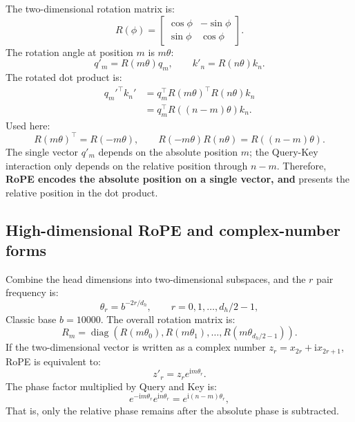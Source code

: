 \documentclass[UTF8,fontset=none,a4paper,10pt]{ctexart}
\newcommand{\term}[1]{\textbf{#1}}
\begin{document}
The two-dimensional rotation matrix is:
\begin{equation}
  R(\phi)=
  \begin{bmatrix}
    \cos\phi&-\sin\phi\\
    \sin\phi&\cos\phi
  \end{bmatrix}.
  \label{en:eq:rotation}
\end{equation}
The rotation angle at position $m$ is $m\theta$:
\begin{equation}
  q'_m=R(m\theta)q_m,\qquad k'_n=R(n\theta)k_n.
  \label{en:eq:rope-rotate}
\end{equation}
The rotated dot product is:
\begin{equation}
  \begin{aligned}
  q_m'^\top k_n'
  &=q_m^\top R(m\theta)^\top R(n\theta)k_n\\
  &=q_m^\top R((n-m)\theta)k_n.
  \end{aligned}
  \label{en:eq:rope-core}
\end{equation}
Used here:
\begin{equation}
  R(m\theta)^\top=R(-m\theta),\qquad
  R(-m\theta)R(n\theta)=R((n-m)\theta).
  \label{en:eq:rotation-group}
\end{equation}
The single vector $q'_m$ depends on the absolute position $m$; the Query-Key interaction only depends on the relative position through $n-m$. Therefore, \term{RoPE encodes the absolute position on a single vector, and } presents the relative position in the dot product.

\subsection{High-dimensional RoPE and complex-number forms}

Combine the head dimensions into two-dimensional subspaces, and the $r$ pair frequency is:
\begin{equation}
  \theta_r=b^{-2r/d_h},\qquad r=0,1,\ldots,d_h/2-1,
  \label{en:eq:rope-frequency}
\end{equation}
Classic base $b=10000$. The overall rotation matrix is:
\begin{equation}
  R_m=\operatorname{diag}\left(
  R(m\theta_0),R(m\theta_1),\ldots,R(m\theta_{d_h/2-1})
  \right).
  \label{en:eq:rope-block}
\end{equation}
If the two-dimensional vector is written as a complex number $z_r=x_{2r}+\mathrm{i}x_{2r+1}$, RoPE is equivalent to:
\begin{equation}
  z'_r=z_r e^{\mathrm{i}m\theta_r}.
  \label{en:eq:rope-complex}
\end{equation}
The phase factor multiplied by Query and Key is:
\begin{equation}
  e^{-\mathrm{i}m\theta_r}e^{\mathrm{i}n\theta_r}
  =e^{\mathrm{i}(n-m)\theta_r},
  \label{en:eq:rope-relative-phase}
\end{equation}
That is, only the relative phase remains after the absolute phase is subtracted.
\end{document}
